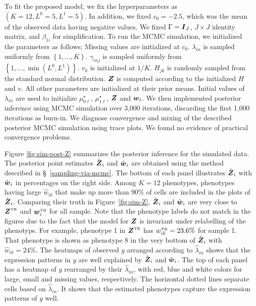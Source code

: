 \documentclass[12pt,]{article}
\newcommand{\bc}[1]{ \left\{#1\right\} }
\def\Z{\bm{Z}}
\newcommand{\true}{{\mbox{\tiny TR}}}
\newcommand{\bZ}{\mbox{\boldmath $Z$}}
\newcommand{\bw}{\mbox{\boldmath $w$}}
\newcommand{\bI}{\mbox{\boldmath $I$}}
\begin{document}
To fit the proposed model, we fix the hyperparameters as $(K=12, L^0=5,
L^1=5)$. In addition, we fixed $c_0=-2.5$, which was the mean of the observed
data having negative values.  We fixed $\Gamma=\bI_J$, $J\times J$ identity
matrix, and $\beta_{1i}$ for simplification. To run the MCMC simulation, we
initialized the parameters as follows; Missing values are initialized at $c_0$.
$\lambda_{in}$ is sampled uniformly from $\bc{1,...,K}$. $\gamma_{inj}$ is
sampled uniformly from $\bc{1,...,\min(L^0,L^1)}$. $v_k$ is initialized at
$1/K$. $H_{jk}$ is randomly sampled from the standard normal distribution.
$\bZ$ is computed according to the initialized $H$ and $v$. All other
parameters are initialized at their prior means.  Initial values of
$\lambda_{in}$ are used to initialize $\mu^{\star}_{0\ell}$,
$\mu^{\star}_{1\ell}$, $\bZ$ and $\bw_i$.  We then implemented posterior
inference using MCMC simulation over 3,000 iterations, discarding the first
1,000 iterations as burn-in.  We diagnose convergence and mixing of the
described posterior MCMC simulation using trace plots. We found no evidence of
practical convergence problems. 


Figure \ref{fig:sim-post-Z} summarizes the posterior inference for the
simulated data.  The posterior point estimates $\hat{\bZ}_i$ and $\hat{\bw}_i$
are obtained using the method described in \S~\ref{sampling-via-mcmc}.  
%
The bottom of each panel illustrates $\hat{\bZ}_i$ with $\hat{\bw}_i$ in
percentages on the right side. Among $K=12$ phenotypes, phenotypes having large
$\hat{w}_{ik}$ that make up more than 90\% of cells are included in the plots
of $\hat{\bZ}_i$. Comparing their truth in Figure~\ref{fig:sim-Z},
$\hat{\bZ}_i$ and $\hat{\bw}_i$ are very close to $\bZ^\true$ and $\bw_i^\true$
for all sample. Note that the phenotype labels do not match in the figures due
to the fact that the model for $\bZ$ is invariant under relabelling of the
phenotyps. For example, phenotype 1 in $\bZ^\true$ has $w^\true_{ik}=23.6\%$
for sample 1.  That phenotype is shown as phenotype 8 in the very bottom of
$\hat{\bZ}_i$ with $\hat{w}_{ik}=24\%$.
The heatmaps of observed $y$ arranged according to $\hat{\lambda}_{in}$ shows
that the expression patterns in $y$ are well explained by $\hat{\bZ}_i$ and
$\hat{\bw}_i$.  The top of each panel has a heatmap of $y$ rearranged by their
$\hat{\lambda}_{in}$, with red, blue and white colors for large, small and
missing values, respectively.  The horizontal dotted lines separate cells based
on $\hat{\lambda}_{in}$.  It shows that the estimated phenotypes capture the
expression patterns of $y$ well.    
\end{document}
